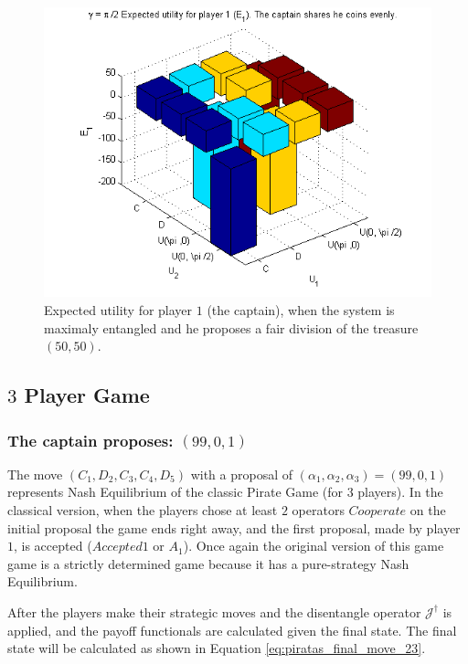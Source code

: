\begin{figure}[h!]
\centering 
\includegraphics[scale=0.60]{Figures/1.5qubit/poorcaptain.png}
\caption{Expected utility for player $1$ (the captain), when the system is maximaly entangled and he proposes a fair division of the treasure $(50,50)$.}
\label{fig:pg_2players_99_0_1:33}
\end{figure}

\subsection{$3$ Player Game}
\label{subsec:3playergame}


\subsubsection{The captain proposes: $(99, 0, 1)$}
\label{subsubsec:3playergame99}

The move $(C_1,D_2,C_3,C_4,D_5)$ with a proposal of $(\alpha_{1}, \alpha_{2}, \alpha_{3}) =(99, 0, 1)$ represents Nash Equilibrium of the classic Pirate Game (for $3$ players). In the classical version, when the players chose at least $2$ operators $Cooperate$ on the initial proposal the game ends right away, and the first proposal, made by player $1$, is accepted ($Accepted 1$ or $A_{1}$). Once again the original version of this game game is a strictly determined game because it has a pure-strategy Nash Equilibrium.

After the players make their strategic moves and the disentangle operator $\mathcal{J}^{\dagger}$ is applied, and the payoff functionals are calculated given the final state. The final state will be calculated as shown in Equation \ref{eq:piratas_final_move_23}.

